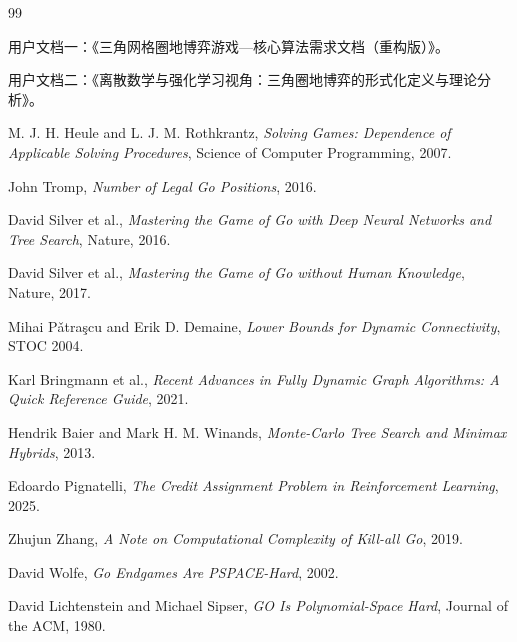 \documentclass[12pt]{ctexart}
\begin{document}
\begin{thebibliography}{99}

用户文档一：《三角网格圈地博弈游戏—核心算法需求文档（重构版）》。

用户文档二：《离散数学与强化学习视角：三角圈地博弈的形式化定义与理论分析》。

M. J. H. Heule and L. J. M. Rothkrantz,
\textit{Solving Games: Dependence of Applicable Solving Procedures},
Science of Computer Programming, 2007.

John Tromp,
\textit{Number of Legal Go Positions},
2016.

David Silver et al.,
\textit{Mastering the Game of Go with Deep Neural Networks and Tree Search},
Nature, 2016.

David Silver et al.,
\textit{Mastering the Game of Go without Human Knowledge},
Nature, 2017.

Mihai P\v{a}tra\c{s}cu and Erik D. Demaine,
\textit{Lower Bounds for Dynamic Connectivity},
STOC 2004.

Karl Bringmann et al.,
\textit{Recent Advances in Fully Dynamic Graph Algorithms: A Quick Reference Guide},
2021.

Hendrik Baier and Mark H. M. Winands,
\textit{Monte-Carlo Tree Search and Minimax Hybrids},
2013.

Edoardo Pignatelli,
\textit{The Credit Assignment Problem in Reinforcement Learning},
2025.

Zhujun Zhang,
\textit{A Note on Computational Complexity of Kill-all Go},
2019.

David Wolfe,
\textit{Go Endgames Are PSPACE-Hard},
2002.

David Lichtenstein and Michael Sipser,
\textit{GO Is Polynomial-Space Hard},
Journal of the ACM, 1980.

\end{thebibliography}
\end{document}
